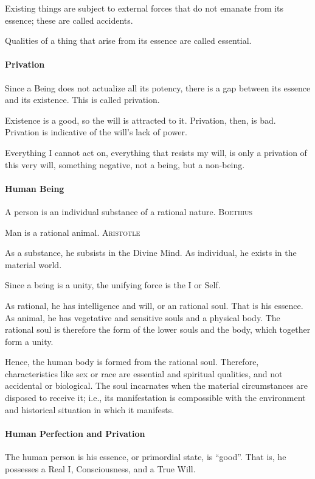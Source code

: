 Existing things are subject to external forces that do not emanate from its essence; these are called accidents.

Qualities of a thing that arise from its essence are called essential.

\paragraph{Privation}
Since a Being does not actualize all its potency, there is a gap between its essence and its existence. This is called privation.

Existence is a good, so the will is attracted to it. Privation, then, is bad. Privation is indicative of the will's lack of power.

\begin{quotex}
Everything I cannot act on, everything that resists my will, is only a privation of this very will, something negative, not a being, but a non-being.  

\end{quotex}
\paragraph{Human Being}
\begin{quotex}
A person is an individual substance of a rational nature. \textsc{Boethius}

Man is a rational animal. \textsc{Aristotle} 

\end{quotex}
As a substance, he subsists in the Divine Mind. As individual, he exists in the material world.

Since a being is a unity, the unifying force is the I or Self.

As rational, he has intelligence and will, or an rational soul. That is his essence. As animal, he has vegetative and sensitive souls and a physical body. The rational soul is therefore the form of the lower souls and the body, which together form a unity.

Hence, the human body is formed from the rational soul. Therefore, characteristics like sex or race are essential and spiritual qualities, and not accidental or biological. The soul incarnates when the material circumstances are disposed to receive it; i.e., its manifestation is compossible with the environment and historical situation in which it manifests.

\paragraph{Human Perfection and Privation}
The human person is his essence, or primordial state, is “good”. That is, he possesses a Real I, Consciousness, and a True Will.

